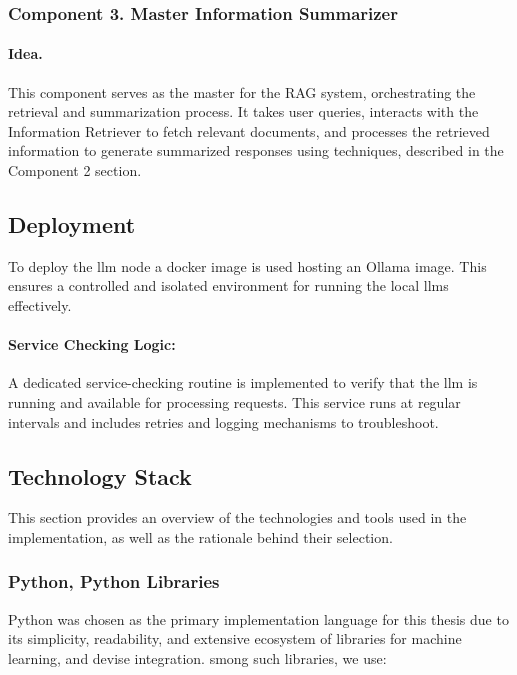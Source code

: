 \subsubsection{Component 3. Master Information Summarizer}

\paragraph{Idea.}{}
This component serves as the master for the RAG system, orchestrating the
retrieval and summarization process. It takes user queries, interacts with the
Information Retriever to fetch relevant documents, and processes the retrieved
information to generate summarized responses using techniques, described in the
Component 2 section.

\subsection{Deployment}

To deploy the \gls{llm} node a docker image is used hosting an Ollama image. This
ensures a controlled and isolated environment for running the local \glspl{llm}
effectively.

\paragraph{Service Checking Logic:} A dedicated service-checking routine
is implemented to verify that the \gls{llm} is running and available for
processing requests. This service runs at regular intervals and
includes retries and logging mechanisms to troubleshoot.

\subsection{Technology Stack}

This section provides an overview of the technologies and tools used in the
implementation, as well as the rationale behind their selection.

\subsubsection{Python, Python Libraries}

Python was chosen as the primary implementation language for this thesis due to
its simplicity, readability, and extensive ecosystem of libraries for machine
learning, and devise integration. smong such libraries, we use:

